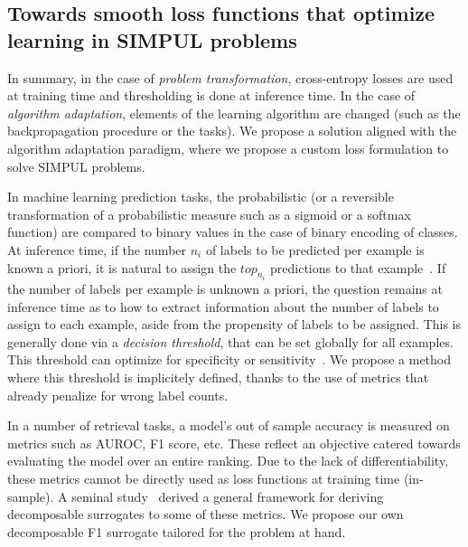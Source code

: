 \subsection{Towards smooth loss functions that optimize learning
in SIMPUL problems}
In summary, in the case of \emph{problem transformation},
cross-entropy losses are used at training time and thresholding is done at
inference time. In the case of \emph{algorithm adaptation}, elements of the
learning algorithm are changed (such as the backpropagation procedure or the
tasks). We propose a solution aligned with the algorithm adaptation paradigm,
where we propose a custom loss formulation to solve SIMPUL problems.

In machine learning prediction tasks, the probabilistic (or a reversible
transformation of a probabilistic measure such as a sigmoid or a softmax
function) are compared to binary values in the case of binary encoding of
classes. At inference time, if the number $n_i$ of labels to be predicted per
example is known a priori, it is natural to assign the $top_{n_i}$ predictions
to that example~\cite{lossTopKError, topKmulticlassSVM}. If the number of
labels per example is unknown a priori, the question remains at inference time
as to how to extract information about the number of labels to assign to each
example, aside from the propensity of labels to be assigned. This is generally
done via a \emph{decision threshold}, that can be set globally for all
examples. This threshold can optimize for specificity or
sensitivity~\cite{decisionThreshold}. We propose a method where this threshold
is implicitely defined, thanks to the use of metrics that already penalize for
wrong label counts.


In a number of retrieval tasks, a model's out of sample accuracy is measured
on metrics such as AUROC, F1 score, etc. These reflect an objective catered
towards evaluating the model over an entire ranking. Due to the lack of
differentiability, these metrics cannot be directly used as loss functions at
training time (in-sample). A seminal study~\cite{optimizableLosses} derived a
general framework for deriving decomposable surrogates to some of these
metrics. We propose our own decomposable F1 surrogate tailored for the problem
at hand.


